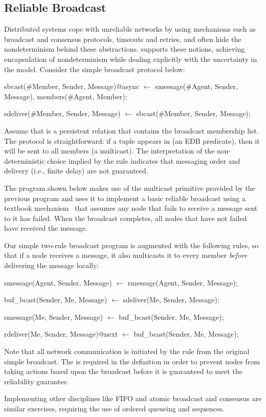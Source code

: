 \subsection{Reliable Broadcast}
Distributed systems cope with unreliable networks by using mechanisms such as broadcast and consensus protocols, 
timeouts and retries, and often hide the nondeterminism behind these abstractions.  \lang supports these notions,
achieving encapsulation of nondeterminism while dealing explicitly with the uncertainty in the model.  Consider the simple
broadcast protocol below:

\begin{Dedalus}
sbcast(#Member, Sender, Message)@async \(\leftarrow\)
  smessage(#Agent, Sender, Message),
  members(#Agent, Member);

sdeliver(#Member, Sender, Message) \(\leftarrow\)
  sbcast(#Member, Sender, Message);
\end{Dedalus}

Assume that  is a persistent relation that contains the
broadcast membership list.  The protocol is straightforward: if a tuple appears
in  (an EDB predicate), then it will be sent to all members (a
multicast).  The interpretation of the non-deterministic choice implied by the
 rule indicates that messaging order and delivery (i.e., finite
delay) are not guaranteed.

The program shown below makes use of the multicast primitive provided by the
previous program and uses it to implement a basic reliable broadcast using a
textbook mechanism~\cite{mullender} that assumes any node that fails to receive
a message sent to it has failed.  When the broadcast completes, all nodes that
have not failed have received the message.

Our simple two-rule broadcast program is augmented with the following rules, so
that if a node receives a message, it also multicasts it to every member
\emph{before} delivering the message locally:

\begin{Dedalus}
smessage(Agent, Sender, Message)  \(\leftarrow\)
  rmessage(Agent, Sender, Message);

buf_bcast(Sender, Me, Message)  \(\leftarrow\)
  sdeliver(Me, Sender, Message);

smessage(Me, Sender, Message)  \(\leftarrow\)
  buf_bcast(Sender, Me, Message);

rdeliver(Me, Sender, Message)@next  \(\leftarrow\)
  buf_bcast(Sender, Me, Message);
\end{Dedalus}

Note that all network communication is initiated by the
 rule from the original simple broadcast.  The  is
required in the  definition in order to prevent nodes from
taking actions based upon the broadcast before it is guaranteed to
meet the reliability guarantee.

Implementing other disciplines like FIFO and atomic broadcast and
consensus are similar exercises, requiring the use of ordered queueing
and sequences.
